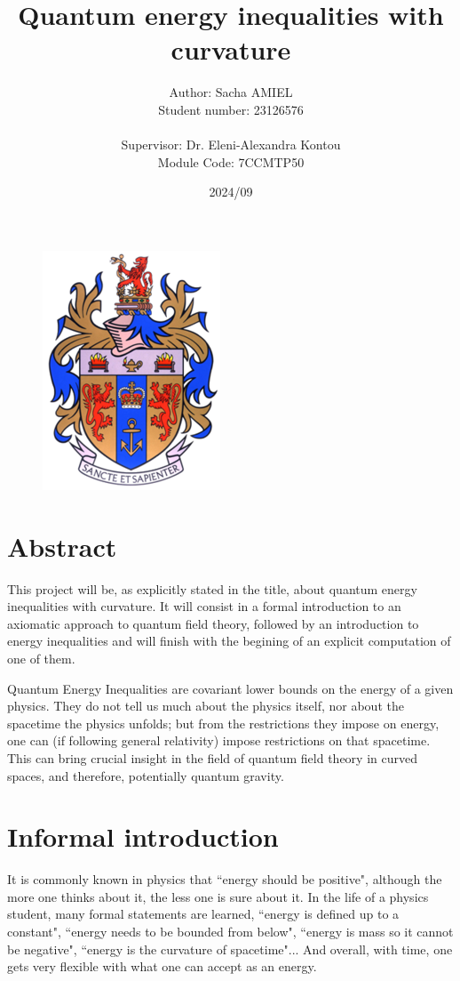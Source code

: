 \documentclass[a4paper,11pt]{article}
\title{Quantum energy inequalities with curvature}
\author{Author: Sacha AMIEL \\
Student number: 23126576\\
\\ Supervisor: Dr. Eleni-Alexandra Kontou \\ Module Code: 7CCMTP50}
\date{2024/09}
\numberwithin{equation}{section}
\theoremstyle{definition}
\begin{document}
\clearpage\maketitle
\thispagestyle{empty}
\begin{figure}[H]
    \centering
    \vspace{100mm}
    \includegraphics[width=0.2\columnwidth]{Template/kcl_logo.png}
\end{figure}

\newpage
\section*{Abstract}
This project will be, as explicitly stated in the title, about quantum energy inequalities with curvature. It will consist in a formal introduction to an axiomatic approach to quantum field theory, followed by an introduction to energy inequalities and will finish with the begining of an explicit computation of one of them.

Quantum Energy Inequalities are covariant lower bounds on the energy of a given physics. They do not tell us much about the physics itself, nor about the spacetime the physics unfolds; but from the restrictions they impose on energy, one can (if following general relativity) impose restrictions on that spacetime. This can bring crucial insight in the field of quantum field theory in curved spaces, and therefore, potentially quantum gravity.

\section*{Informal introduction}
It is commonly known in physics that ``energy should be positive", although the more one thinks about it, the less one is sure about it. In the life of a physics student, many formal statements are learned, ``energy is defined up to a constant", ``energy needs to be bounded from below", ``energy is mass so it cannot be negative", ``energy is the curvature of spacetime"... And overall, with time, one gets very flexible with what one can accept as an energy.
\end{document}
